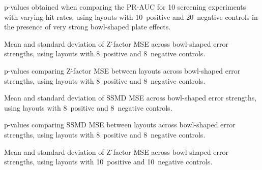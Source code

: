 \begin{table}[p]
    \centering
    \small
    
    \caption{p-values obtained when comparing the PR-AUC for 10 screening experiments with varying hit rates, using layouts with 10~positive and 20~negative controls in the presence of very strong bowl-shaped plate effects.}
    \label{tab:screening-pr_pvalues-20-10-0.2}
\end{table}


\clearpage

\begin{table}[p]
    \centering
    \small
    
    \caption{Mean and standard deviation of Z\'-factor MSE across bowl-shaped error strengths, using layouts with 8~positive and 8~negative controls.}
    \label{tab:metrics-zfactor-mean-std-8-8}
\end{table}

\begin{table}[p]
    \centering
    \small
    
    \caption{p-values comparing Z\'-factor MSE between layouts across bowl-shaped error strengths, using layouts with 8~positive and 8~negative controls.}
    \label{tab:metrics-zfactor-pvalues-8-8}
\end{table}

\begin{table}[p]
    \centering
    \small
    
    \caption{Mean and standard deviation of SSMD MSE across bowl-shaped error strengths, using layouts with 8~positive and 8~negative controls.}
    \label{tab:metrics-ssmd-mean-std-8-8}
\end{table}

\begin{table}[p]
    \centering
    \small
    
    \caption{p-values comparing SSMD MSE between layouts across bowl-shaped error strengths, using layouts with 8~positive and 8~negative controls.}
    \label{tab:metrics-ssmd-pvalues-8-8}
\end{table}

\clearpage
\begin{table}[p]
    \centering
    \small
    
    \caption{Mean and standard deviation of Z\'-factor MSE across bowl-shaped error strengths, using layouts with 10~positive and 10~negative controls.}
    \label{tab:metrics-zfactor-mean-std-10-10}
\end{table}


